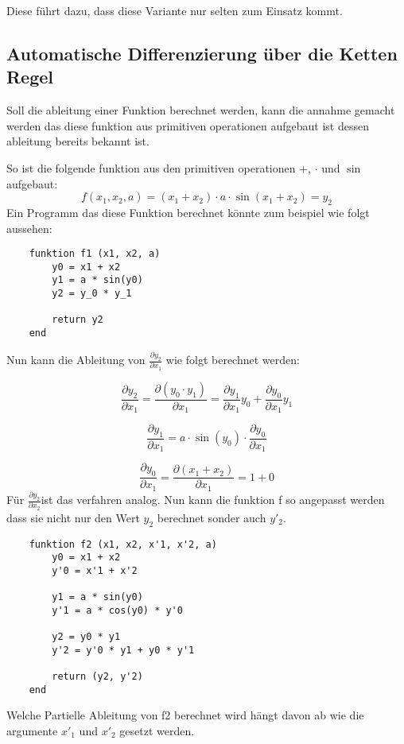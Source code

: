 Diese führt dazu, dass diese Variante nur selten zum Einsatz kommt.


\subsection{Automatische Differenzierung über die Ketten Regel} \label{sec:ketten_regel}

Soll die ableitung einer Funktion berechnet werden, kann die annahme gemacht werden das diese funktion aus primitiven operationen aufgebaut ist dessen ableitung bereits bekannt ist.

So ist die folgende funktion aus den primitiven operationen $+$, $\cdot$  und $\sin$ aufgebaut:
$$
f(x_1, x_2, a) = (x_1 + x_2) \cdot a \cdot \sin(x_1 + x_2) = y_2
$$
Ein Programm das diese Funktion berechnet könnte zum beispiel wie folgt aussehen:

\begin{lstlisting}
    funktion f1 (x1, x2, a)
        y0 = x1 + x2
        y1 = a * sin(y0)
        y2 = y_0 * y_1
        
    	return y2
    end
\end{lstlisting}

Nun kann die Ableitung von $\frac{\partial y_2}{\partial x_1}$ wie folgt berechnet werden:

$$
	\frac{\partial y_2}{\partial x_1} = \frac{\partial (y_0 \cdot y_1)}{\partial x_1} = \frac{\partial  y_1}{\partial x_1} y_0  + \frac{\partial y_0 }{\partial x_1} y_1
$$

$$
	\frac{\partial y_1}{ \partial x_1 } = a \cdot \sin(y_0) \cdot \frac{\partial y_0}{\partial x_1}
$$

$$
	\frac{\partial y_0}{\partial x_1} = \frac{\partial (x_1 + x_2)}{\partial x_1} = 1 + 0
$$Für $\frac{\partial y_2}{\partial x_2}$ist das verfahren analog. 
Nun kann die funktion f so angepasst werden dass sie nicht nur den Wert $y_2$ berechnet sonder auch $y'_2$.

\begin{lstlisting}
    funktion f2 (x1, x2, x'1, x'2, a)
        y0 = x1 + x2
        y'0 = x'1 + x'2

        y1 = a * sin(y0)
        y'1 = a * cos(y0) * y'0

		y2 = y0 * y1
        y'2 = y'0 * y1 + y0 * y'1
        
        return (y2, y'2)
    end
\end{lstlisting}

Welche Partielle Ableitung von f2 berechnet wird hängt davon ab wie die argumente $x'_1$ und $x'_2$ gesetzt werden.

